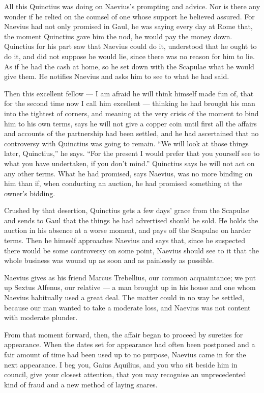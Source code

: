  All this Quinctius was doing on Naevius's prompting and advice. Nor is there any wonder if he relied on the counsel of one whose support he believed assured. For Naevius had not only promised in Gaul, he was saying every day at Rome that, the moment Quinctius gave him the nod, he would pay the money down. Quinctius for his part saw that Naevius could do it, understood that he ought to do it, and did not suppose he would lie, since there was no reason for him to lie. As if he had the cash at home, so he set down with the Scapulae what he would give them. He notifies Naevius and asks him to see to what he had said.

 Then this excellent fellow --- I am afraid he will think himself made fun of, that for the second time now I call him excellent --- thinking he had brought his man into the tightest of corners, and meaning at the very crisis of the moment to bind him to his own terms, says he will not give a copper coin until first all the affairs and accounts of the partnership had been settled, and he had ascertained that no controversy with Quinctius was going to remain. ``We will look at those things later, Quinctius,'' he says. ``For the present I would prefer that you yourself see to what you have undertaken, if you don't mind.'' Quinctius says he will not act on any other terms. What he had promised, says Naevius, was no more binding on him than if, when conducting an auction, he had promised something at the owner's bidding.

 Crushed by that desertion, Quinctius gets a few days' grace from the Scapulae and sends to Gaul that the things he had advertised should be sold. He holds the auction in his absence at a worse moment, and pays off the Scapulae on harder terms. Then he himself approaches Naevius and says that, since he suspected there would be some controversy on some point, Naevius should see to it that the whole business was wound up as soon and as painlessly as possible.

 Naevius gives as his friend Marcus Trebellius, our common acquaintance; we put up Sextus Alfenus, our relative --- a man brought up in his house and one whom Naevius habitually used a great deal. The matter could in no way be settled, because our man wanted to take a moderate loss, and Naevius was not content with moderate plunder.

 From that moment forward, then, the affair began to proceed by sureties for appearance. When the dates set for appearance had often been postponed and a fair amount of time had been used up to no purpose, Naevius came in for the next appearance. I beg you, Gaius Aquilius, and you who sit beside him in council, give your closest attention, that you may recognise an unprecedented kind of fraud and a new method of laying snares.

